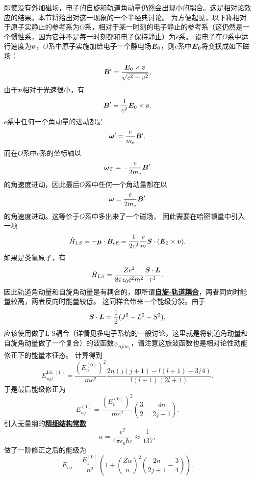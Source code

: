 \documentclass[UTF8, a4paper]{ctexart}
\renewcommand{\autoref}{\prettyref}
\newcommand*{\concept}[1]{\underline{\textbf{#1}}}
\begin{document}
即使没有外加磁场，电子的自旋和轨道角动量仍然会出现小的耦合。这是相对论效应的结果。本节将给出对这一现象的一个半经典讨论。
为方便起见，以下称相对于原子实静止的参考系为$O$系，相对于某一时刻的电子静止的参考系（这仍然是一个惯性系，因为它并不是每一时刻都和电子保持静止）为$e$系。
设电子在$O$系中运行速度为$\vb*{v}$，$O$系中原子实施加给电子一个静电场$\vb*{E}_0$，则$e$系中$\vb*{E}_0$将变换成如下磁场：
\[
    \vb*{B}' = \frac{\vb*{E}_0 \times \vb*{v}}{\sqrt{c^2 - v^2}},
\]
由于$\vb*{v}$相对于光速很小，有
\begin{equation}
    \vb*{B}' = \frac{1}{c^2} \vb*{E}_0 \times \vb*{v}.
\end{equation}
$e$系中任何一个角动量的进动都是%
\[
    \vb*{\omega}' = \frac{e}{m_\text{e}} \vb*{B}',
\]
而在$O$系中$e$系的坐标轴以
\[
    \vb*{\omega}_T = - \frac{e}{2 m_\text{e}} \vb*{B}'
\]
的角速度进动，因此最后$O$系中任何一个角动量都在以
\begin{equation}
    \vb*{\omega} = \frac{e}{2 m_\text{e}} \vb*{B}'
\end{equation}
的角速度进动。这等价于$O$系中多出来了一个磁场，%
因此需要在哈密顿量中引入一项
\begin{equation}
    \hat{H}_{LS} = - \vb*{\mu} \cdot \vb*{B}_\text{eff} = \frac{1}{2c^2} \frac{e}{m} \vb*{S} \cdot (\vb*{E}_0 \times \vb*{v}).
\end{equation}
如果是类氢原子，有
\begin{equation}
    \hat{H}_{LS} = \frac{Ze^2}{8 \pi \epsilon_0 c^2 m^2} \frac{\vb*{S} \cdot \vb*{L}}{r^3}.
    \label{eq:spin-ortibal-coupling}
\end{equation}
因此轨道角动量和自旋角动量是有耦合的，即所谓\concept{自旋-轨道耦合}，两者同向时能量较高，两者反向时能量较低。
这同样会带来一个能级分裂。由于
\[
    \vb*{S} \cdot \vb*{L} = \frac{1}{2} (J^2 - L^2 - S^2),
\]
应该使用做了L-S耦合（详情见多电子系统的一般讨论\autoref{sec:ls-coupling}，这里就是将轨道角动量和自旋角动量做了一个复合）的波函数$\psi_{njl m_j}$，请注意这族波函数也是相对论性动能修正下的能量本征态。
计算得到
\begin{equation}
    E^{\text{LS}, (1)}_{njl} = \frac{(E^{(0)}_n)^2}{mc^2} \frac{2n (j(j+1) - l(l+1) - 3/4)}{l(l+1)(2l+1)}.
\end{equation}
于是最后能级修正为
\begin{equation}
    E^{(1)}_{nj} = \frac{(E^{(0)}_n)^2}{mc^2} \left( \frac{3}{2} - \frac{4 n}{2 j + 1} \right).
\end{equation}
引入无量纲的\concept{精细结构常数}
\begin{equation}
    \alpha = \frac{e^2}{4\pi \epsilon_0 \hbar c} \approx \frac{1}{137},
\end{equation}
做了一阶修正之后的能级为
\begin{equation}
    E_{n j} = \frac{E_1^{(0)}}{n^2} \left( 1 + \left( \frac{Z \alpha}{n} \right)^2 \left(  \frac{2 n}{2 j + 1} - \frac{3}{4} \right) \right).
\end{equation}
\end{document}
